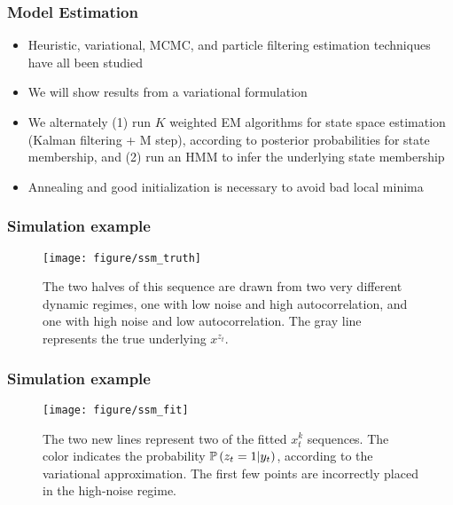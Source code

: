 \documentclass{beamer}
\begin{document}
\begin{frame}
  \frametitle{Model Estimation}
  \begin{itemize}
  \item Heuristic, variational, MCMC, and particle filtering estimation
    techniques have all been studied \citep{harrison1976bayesian, ghahramani2000variational, fruhwirth2001markov, doucet2001particle}
  \item We will show results from a variational formulation
  \item We alternately (1) run $K$ weighted EM algorithms for state space
    estimation (Kalman filtering + M step), according to posterior probabilities
    for state membership, and (2) run an HMM to infer the underlying state
    membership
  \item Annealing and good initialization is necessary to avoid bad local minima
  \end{itemize}
\end{frame}

\begin{frame}
  \frametitle{Simulation example}
\begin{figure}[ht]
  \centering
  \texttt{[image: figure/ssm\_truth]}
  \caption{The two halves of this sequence are drawn from two very different
    dynamic regimes, one with low noise and high autocorrelation, and one with
    high noise and low autocorrelation. The gray line represents the true
    underlying $x^{z_{t}}$. \label{fig:ssm_truth} }
\end{figure}
\end{frame}

\begin{frame}
  \frametitle{Simulation example}
\begin{figure}[ht]
  \centering
  \texttt{[image: figure/ssm\_fit]}
  \caption{The two new lines represent two of the fitted $x_{t}^{k}$ sequences.
    The color indicates the probability $\mathbb{P}\left({z_{t} = 1 \vert y_{t}}\right)$,
      according to the variational approximation. The first few points are
      incorrectly placed in the high-noise regime.\label{fig:ssm_truth} }
\end{figure}
\end{frame}
\end{document}
